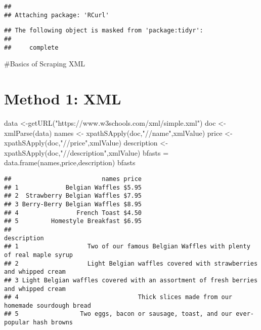 \documentclass[
]{article}
\newenvironment{Shaded}{\begin{snugshade}}{\end{snugshade}}
\newcommand{\FunctionTok}[1]{\textcolor[rgb]{0.00,0.00,0.00}{#1}}
\newcommand{\NormalTok}[1]{#1}
\newcommand{\OtherTok}[1]{\textcolor[rgb]{0.56,0.35,0.01}{#1}}
\newcommand{\StringTok}[1]{\textcolor[rgb]{0.31,0.60,0.02}{#1}}
\begin{document}
\begin{verbatim}
## 
## Attaching package: 'RCurl'
\end{verbatim}

\begin{verbatim}
## The following object is masked from 'package:tidyr':
## 
##     complete
\end{verbatim}

\#Basics of Scraping XML

\hypertarget{method-1-xml}{%
\section{Method 1: XML}\label{method-1-xml}}

\begin{Shaded}
\begin{Highlighting}[]
\NormalTok{data }\OtherTok{\textless{}{-}}\FunctionTok{getURL}\NormalTok{(}\StringTok{"https://www.w3schools.com/xml/simple.xml"}\NormalTok{)}
\NormalTok{doc }\OtherTok{\textless{}{-}} \FunctionTok{xmlParse}\NormalTok{(data)}
\NormalTok{names }\OtherTok{\textless{}{-}} \FunctionTok{xpathSApply}\NormalTok{(doc,}\StringTok{"//name"}\NormalTok{,xmlValue)}
\NormalTok{price }\OtherTok{\textless{}{-}} \FunctionTok{xpathSApply}\NormalTok{(doc,}\StringTok{"//price"}\NormalTok{,xmlValue)}
\NormalTok{description }\OtherTok{\textless{}{-}} \FunctionTok{xpathSApply}\NormalTok{(doc,}\StringTok{"//description"}\NormalTok{,xmlValue)}
\NormalTok{bfasts }\OtherTok{=} \FunctionTok{data.frame}\NormalTok{(names,price,description)}
\NormalTok{bfasts}
\end{Highlighting}
\end{Shaded}

\begin{verbatim}
##                         names price
## 1             Belgian Waffles $5.95
## 2  Strawberry Belgian Waffles $7.95
## 3 Berry-Berry Belgian Waffles $8.95
## 4                French Toast $4.50
## 5         Homestyle Breakfast $6.95
##                                                                           description
## 1                   Two of our famous Belgian Waffles with plenty of real maple syrup
## 2                   Light Belgian waffles covered with strawberries and whipped cream
## 3 Light Belgian waffles covered with an assortment of fresh berries and whipped cream
## 4                                 Thick slices made from our homemade sourdough bread
## 5                 Two eggs, bacon or sausage, toast, and our ever-popular hash browns
\end{verbatim}
\end{document}
